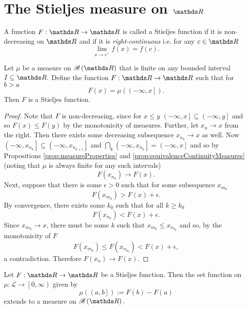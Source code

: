 \section{The Stieljes measure on $\protect\R$}
\begin{defn}
\label{def:stieljesFunction}A function $F:\R\to\R$ is called a Stieljes
function if it is non-decreasing on $\R$ and if it is \emph{right-continuous
}i.e. for any $c\in\R$
\[
\lim_{x\to c^{+}}f\left(x\right)=f\left(c\right).
\]
\end{defn}

\begin{prop}
\label{prop:measureDefinesStieljes}Let $\mu$ be a measure on $\borel\left(\R\right)$
that is finite on any bounded interval $I\subseteq\R.$ Define the
function $F:\R\to\R$ such that for $b>a$
\[
F\left(x\right)=\mu\left(\left(-\infty,x\right]\right).
\]
Then $F$ is a Stieljes function.
\end{prop}

\begin{proof}
Note that $F$ is non-decreasing, since for $x\leq y$ $\left(-\infty,x\right]\subseteq\left(-\infty,y\right]$
and so $F\left(x\right)\leq F\left(y\right)$ by the monotonicity
of measures. Further, let $x_{n}\to x$ from the right. Then there
exists some decreasing subsequence $x_{n_{k}}\to x$ as well. Now
$\left(-\infty,x_{n_{k}}\right]\subseteq\left(-\infty,x_{n_{k+1}}\right]$
and $\bigcap_{k}\left(-\infty,x_{n_{k}}\right]=\left(-\infty,x\right]$
and so by Propositions \ref{prop:measureProperties} and \ref{prop:equivalenceContinuityMeasures}
(noting that $\mu$ is always finite for any such intervals)
\[
F\left(x_{n_{k}}\right)\to F\left(x\right).
\]
Next, suppose that there is some $\epsilon>0$ such that for some
subsequence $x_{m_{k}}$
\[
F\left(x_{m_{k}}\right)>F\left(x\right)+\epsilon.
\]
By convergence, there exists some $k_{0}$ such that for all $k\geq k_{0}$
\[
F\left(x_{n_{k}}\right)<F\left(x\right)+\epsilon.
\]
Since $x_{m_{k}}\to x$, there must be some $k$ such that $x_{m_{k}}\leq x_{n_{k_{0}}}$
and so, by the monotonicity of $F$
\[
F\left(x_{m_{k}}\right)\leq F\left(x_{n_{k_{0}}}\right)<F\left(x\right)+\epsilon,
\]
a contradiction. Therefore $F\left(x_{n}\right)\to F\left(x\right).$
\end{proof}
\begin{thm}
\label{thm:stieljesMeasure}Let $F:\R\to\R$ be a Stieljes function.
Then the set function on $\mu:\mathcal{L\to}\left[0,\infty\right)$
given by
\[
\mu\left(\left(a,b\right]\right):=F\left(b\right)-F\left(a\right)
\]
extends to a measure on $\borel\left(\R\right).$
\end{thm}

